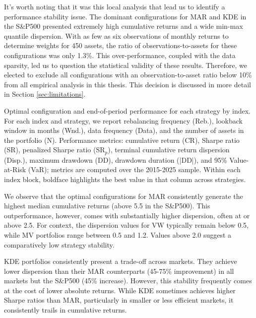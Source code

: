 It's worth noting that it was this local analysis that lead us to identify a performance stability issue. The dominant configurations for MAR and KDE in the S\&P500 presented extremely high cumulative returns and a wide min-max quantile dispersion. With as few as six observations of monthly returns to determine weights for 450 assets, the ratio of observations-to-assets for these configurations was only 1.3\%. This over-performance, coupled with the data sparsity, led us to question the statistical validity of these results. Therefore, we elected to exclude all configurations with an observation-to-asset ratio below 10\% from all empirical analysis in this thesis. This decision is discussed in more detail in Section \ref{sec:limitations}.

\vspace{10mm}
\begin{table}[H]
  \centering
  
  \caption[All optimal configurations]{Optimal configuration and end-of-period performance for each strategy by index. For each index and strategy, we report rebalancing frequency (Reb.), lookback window in months (Wnd.), data frequency (Data), and the number of assets in the portfolio (N). Performance metrics: cumulative return (CR), Sharpe ratio (SR), penalized Sharpe ratio (SR$_p$), terminal cumulative return dispersion (Disp.), maximum drawdown (DD), drawdown duration (|DD|), and 95\% Value-at-Risk (VaR); metrics are computed over the 2015-2025 sample. Within each index block, boldface highlights the best value in that column across strategies.}

  \label{tab:single9}
\end{table}

\newpage
We observe that the optimal configurations for MAR consistently generate the highest median cumulative returns (above 5.5 in the S\&P500). This outperformance, however, comes with substantially higher dispersion, often at or above 2.5. For context, the dispersion values for VW typically remain below 0.5, while MV portfolios range between 0.5 and 1.2. Values above 2.0 suggest a comparatively low strategy stability.

KDE portfolios consistently present a trade-off across markets. They achieve lower dispersion than their MAR counterparts (45-75\% improvement) in all markets but the S\&P500 (45\% increase). However, this stability frequently comes at the cost of lower absolute returns. While KDE sometimes achieves higher Sharpe ratios than MAR, particularly in smaller or less efficient markets, it consistently trails in cumulative returns.

